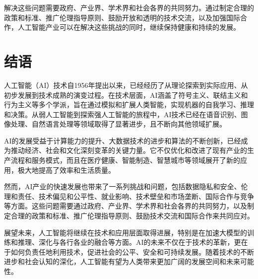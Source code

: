解决这些问题需要政府、产业界、学术界和社会各界的共同努力。通过制定合理的政策和标准、推广伦理指导原则、鼓励开放和透明的技术交流，以及加强国际合作，人工智能产业可以在解决这些挑战的同时，继续保持健康和持续的发展。

\section{结语}

人工智能（AI）技术自1956年提出以来，已经经历了从理论探索到实际应用、从初步发展到技术成熟的演变过程。在技术层面，AI涵盖了符号主义、联结主义和行为主义等多个学派，旨在通过模拟和扩展人类智能，实现机器的自我学习、推理和决策。从弱人工智能到探索强人工智能的旅程中，AI技术已经在语音识别、图像处理、自然语言处理等领域取得了显著进步，且不断向其他领域扩展。

AI的发展受益于计算能力的提升、大数据技术的进步和算法的不断创新，已经成为推动经济、社会和文化深刻变革的关键力量。它不仅优化和改进了现有产业的生产流程和服务模式，而且在医疗健康、智能制造、智慧城市等领域展开了新的应用，极大地提高了效率和生活质量。

然而，AI产业的快速发展也带来了一系列挑战和问题，包括数据隐私和安全、伦理和责任、技术偏见和公平性、就业影响、技术壁垒和市场垄断、国际合作与竞争等方面。这些问题需要通过政府、产业界、学术界和社会各界的共同努力，以及制定合理的政策和标准、推广伦理指导原则、鼓励技术交流和国际合作来共同应对。

展望未来，人工智能将继续在技术和应用层面取得进展，特别是在加速大模型的训练和推理、深化与各行各业的融合等方面。AI的未来不仅在于技术的革新，更在于如何负责任地利用技术，促进社会的公平、安全和可持续发展。随着技术的不断进步和社会认知的深化，人工智能有望为人类带来更加广阔的发展空间和未来可能性。
